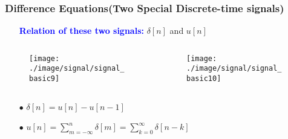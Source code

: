 \documentclass{beamer}
\newcommand{\blue}[1]{\textcolor{blue}{#1}}
\begin{document}
\begin{frame}


\frametitle{Difference Equations(Two Special Discrete-time signals)}


\begin{itemize} \itemsep6pt \parskip0pt 
  \item[] \blue{\bf Relation of these two signals:} $\delta[n]$ and $u[n]$
\end{itemize}


\begin{columns}
\begin{column}{6 cm}
  \begin{figure}[H]
  \centering
  \texttt{[image: ./image/signal/signal\_basic9]}
  \end{figure}
\end{column}
\begin{column}{6 cm}
  \begin{figure}[H]
  \centering
  \texttt{[image: ./image/signal/signal\_basic10]}
  \end{figure}
\end{column}
\end{columns}



\begin{itemize} \itemsep6pt \parskip0pt 
  \item[$\bullet$] $\delta[n] = u[n] - u[n-1]$
  \item[$\bullet$] $u[n] = \sum^{n}_{m=-\infty}\delta[m] = \sum^{\infty}_{k=0}\delta[n-k]$
\end{itemize}

\end{frame}


\end{document}
